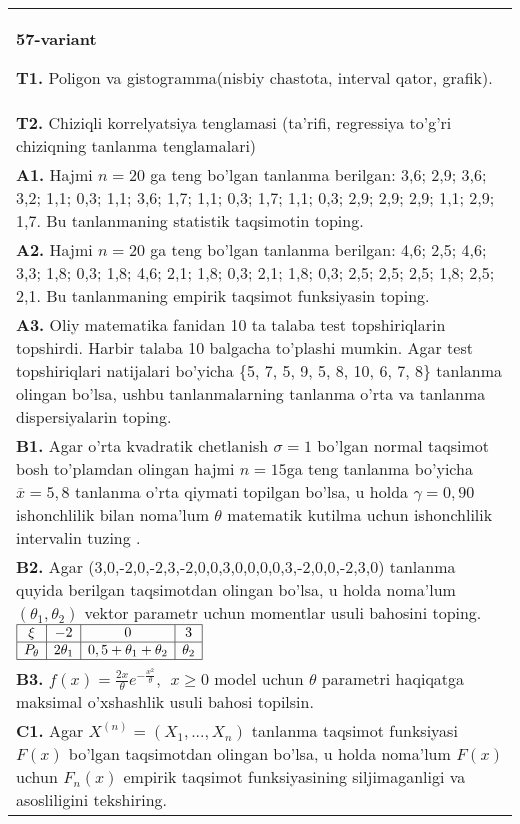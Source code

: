 \documentclass{article}
\begin{document}
\begin{tabular}{m{17cm}}
\textbf{57-variant}
\newline

\textbf{T1.} 
Poligon va gistogramma(nisbiy chastota, interval qator, grafik).
\\
\textbf{T2.} 
Chiziqli korrelyatsiya tenglamasi (ta'rifi, regressiya to'g'ri chiziqning tanlanma tenglamalari)
\\
\textbf{A1.} 
Hajmi \(n = 20\) ga teng bo'lgan tanlanma berilgan: 3,6; 2,9; 3,6; 3,2; 1,1; 0,3; 1,1; 3,6; 1,7; 1,1; 0,3; 1,7; 1,1; 0,3; 2,9; 2,9; 2,9; 1,1; 2,9; 1,7. Bu tanlanmaning statistik taqsimotin toping.
\\
\textbf{A2.} 
Hajmi \(n = 20\) ga teng bo'lgan tanlanma berilgan: 4,6; 2,5; 4,6; 3,3; 1,8; 0,3; 1,8; 4,6; 2,1; 1,8; 0,3; 2,1; 1,8; 0,3; 2,5; 2,5; 2,5; 1,8; 2,5; 2,1. Bu tanlanmaning empirik taqsimot funksiyasin toping.
\\
\textbf{A3.} 
Oliy matematika fanidan 10 ta talaba test topshiriqlarin topshirdi. Harbir talaba 10 balgacha to'plashi mumkin. Agar test topshiriqlari natijalari bo'yicha \{5, 7, 5, 9, 5, 8, 10, 6, 7, 8\} tanlanma olingan bo'lsa, ushbu tanlanmalarning tanlanma o'rta va tanlanma dispersiyalarin toping.
\\
\textbf{B1.} 
Agar o'rta kvadratik chetlanish \(\sigma = 1\) bo'lgan normal taqsimot bosh to'plamdan olingan hajmi \(n = 15\)ga teng tanlanma bo'yicha \(\overline{x} = 5,8\) tanlanma o'rta qiymati topilgan bo'lsa, u holda \(\gamma = 0,90\) ishonchlilik bilan noma'lum \(\theta\) matematik kutilma uchun ishonchlilik intervalin tuzing .
\\
\textbf{B2.} 
Agar (3,0,-2,0,-2,3,-2,0,0,3,0,0,0,0,3,-2,0,0,-2,3,0) tanlanma quyida berilgan taqsimotdan olingan bo'lsa, u holda noma'lum \(\left( \theta_{1},\theta_{2} \right)\) vektor parametr uchun momentlar usuli bahosini toping.
$\begin{array}{|c|c|c|c|}
    \hline
    \xi & - 2 & 0 & 3 \\
    \hline
    P_{\theta} & 2\theta_{1} & 0,5 + \theta_{1} + \theta_{2} & \theta_{2} \\
    \hline
\end{array}$
\\
\textbf{B3.} 
\(f(x) = \frac{2x}{\theta}e^{- \frac{x^{2}}{\theta}},\ \ x \geq 0\) model uchun \(\theta\) parametri haqiqatga maksimal o'xshashlik usuli bahosi topilsin.
\\
\textbf{C1.} 
Agar \(X^{(n)} = \left( X_{1},...,X_{n} \right)\) tanlanma taqsimot funksiyasi \(F(x)\) bo'lgan taqsimotdan olingan bo'lsa, u holda noma'lum \(F(x)\) uchun \(F_{n}(x)\) empirik taqsimot funksiyasining siljimaganligi va asosliligini tekshiring.

\end{tabular}
\end{document}
